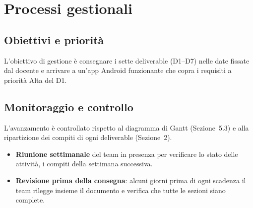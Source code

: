 \section{Processi gestionali}

\subsection{Obiettivi e priorità}
L'obiettivo di gestione è consegnare i sette deliverable (D1--D7) nelle date fissate dal docente e arrivare a un'app Android funzionante che copra i requisiti a priorità Alta del D1. 

\subsection{Monitoraggio e controllo}
L'avanzamento è controllato rispetto al diagramma di Gantt (Sezione~5.3) e alla ripartizione dei compiti di ogni deliverable (Sezione~2).
\begin{itemize}
    \item \textbf{Riunione settimanale} del team in presenza  per verificare lo stato delle attività, i compiti della settimana successiva.
    \item \textbf{Revisione prima della consegna}: alcuni giorni prima di ogni scadenza il team rilegge insieme il documento  e verifica che tutte le sezioni siano complete.
\end{itemize}

